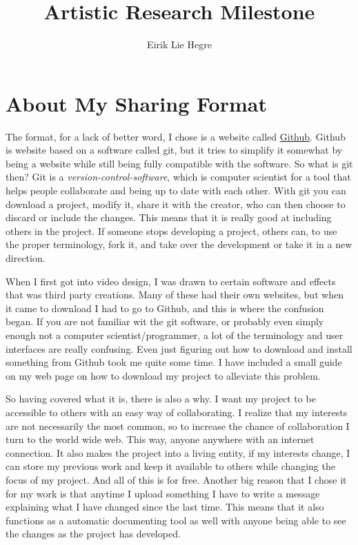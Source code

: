\documentclass[12pt, letterpaper]{article}
\title{Artistic Research Milestone}
\author{Eirik Lie Hegre}
\begin{document}
\maketitle

\section{About My Sharing Format}
The format, for a lack of better word, I chose is a website called
\href{https://Github.com}{Github}. Github is website based on a software
called git, but it tries to simplify it somewhat by being a website while still
being fully compatible with the software. So what is git then? Git is a
\textit{version-control-software}, which is computer scientist for a
tool that helps people collaborate and being up to date with each other. With
git you can download a project, modify it, share it with the creator, who can
then choose to discard or include the changes. This means that it is really good
at including others in the project. If someone stops developing a project,
others can, to use the proper terminology, fork it, and take over the
development or take it in a new direction.
\par
When I first got into video design, I was drawn to certain software and effects
that was third party creations. Many of these had their own websites, but when
it came to download I had to go to Github, and this is where the confusion
began. If you are not familiar wit the git software, or probably even
simply enough not a computer scientist/programmer, a lot of the terminology and
user interfaces are really confusing. Even just figuring out how to download
and install something from Github took me quite some time. I have included a
small guide on my web page on how to download my project to alleviate this
problem.
\par
So having covered what it is, there is also a why. I want my project to be
accessible to others with an easy way of collaborating. I realize that my
interests are not necessarily the most common, so to increase the chance of
collaboration I turn to the world wide web. This way, anyone anywhere with an
internet connection. It also makes the project into a living entity, if my
interests change, I can store my previous work and keep it available to others
while changing the focus of my project. And all of this is for free. Another
big reason that I chose it for my work is that anytime I upload something I
have to write a message explaining what I have changed since the last time.
This means that it also functions as a automatic documenting tool as well
with anyone being able to see the changes as the project has developed.
\end{document}

